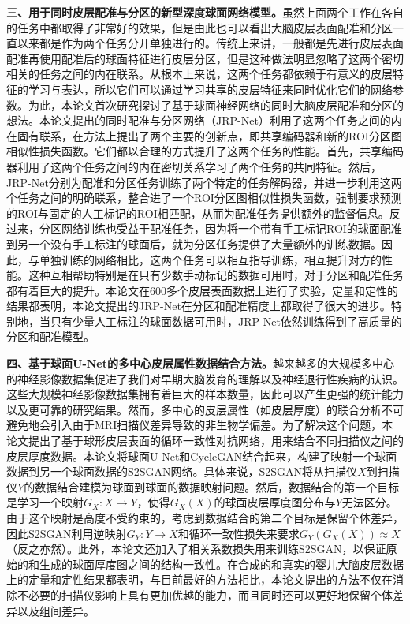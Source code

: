 \textbf{三、用于同时皮层配准与分区的新型深度球面网络模型。}虽然上面两个工作在各自的任务中都取得了非常好的效果，但是由此也可以看出大脑皮层表面配准和分区一直以来都是作为两个任务分开单独进行的。传统上来讲，一般都是先进行皮层表面配准再使用配准后的球面特征进行皮层分区，但是这种做法明显忽略了这两个密切相关的任务之间的内在联系。从根本上来说，这两个任务都依赖于有意义的皮层特征的学习与表达，所以它们可以通过学习共享的皮层特征来同时优化它们的网络参数。为此，本论文首次研究探讨了基于球面神经网络的同时大脑皮层配准和分区的想法。本论文提出的同时配准与分区网络（JRP-Net）利用了这两个任务之间的内在固有联系，在方法上提出了两个主要的创新点，即共享编码器和新的ROI分区图相似性损失函数。它们都以合理的方式提升了这两个任务的性能。首先，共享编码器利用了这两个任务之间的内在密切关系学习了两个任务的共同特征。然后，JRP-Net分别为配准和分区任务训练了两个特定的任务解码器，并进一步利用这两个任务之间的明确联系，整合进了一个ROI分区图相似性损失函数，强制要求预测的ROI与固定的人工标记的ROI相匹配，从而为配准任务提供额外的监督信息。反过来，分区网络训练也受益于配准任务，因为将一个带有手工标记ROI的球面配准到另一个没有手工标注的球面后，就为分区任务提供了大量额外的训练数据。因此，与单独训练的网络相比，这两个任务可以相互指导训练，相互提升对方的性能。这种互相帮助特别是在只有少数手动标记的数据可用时，对于分区和配准任务都有着巨大的提升。本论文在600多个皮层表面数据上进行了实验，定量和定性的结果都表明，本论文提出的JRP-Net在分区和配准精度上都取得了很大的进步。特别地，当只有少量人工标注的球面数据可用时，JRP-Net依然训练得到了高质量的分区和配准模型。

\textbf{四、基于球面U-Net的多中心皮层属性数据结合方法。}越来越多的大规模多中心的神经影像数据集促进了我们对早期大脑发育的理解以及神经退行性疾病的认识。这些大规模神经影像数据集拥有着巨大的样本数量，因此可以产生更强的统计能力以及更可靠的研究结果。然而，多中心的皮层属性（如皮层厚度）的联合分析不可避免地会引入由于MRI扫描仪差异导致的非生物学偏差。为了解决这个问题，本论文提出了基于球形皮层表面的循环一致性对抗网络，用来结合不同扫描仪之间的皮层厚度数据。本论文将球面U-Net和CycleGAN结合起来，构建了映射一个球面数据到另一个球面数据的S2SGAN网络。具体来说，S2SGAN将从扫描仪$X$到扫描仪$Y$的数据结合建模为球面到球面的数据映射问题。然后，数据结合的第一个目标是学习一个映射$G_X:X\rightarrow Y$，使得$G_X(X)$的球面皮层厚度图分布与$Y$无法区分。由于这个映射是高度不受约束的，考虑到数据结合的第二个目标是保留个体差异，因此S2SGAN利用逆映射$G_Y:Y\rightarrow X$和循环一致性损失来要求$G_Y(G_X(X))\approx X$（反之亦然）。此外，本论文还加入了相关系数损失用来训练S2SGAN，以保证原始的和生成的球面厚度图之间的结构一致性。在合成的和真实的婴儿大脑皮层数据上的定量和定性结果都表明，与目前最好的方法相比，本论文提出的方法不仅在消除不必要的扫描仪影响上具有更加优越的能力，而且同时还可以更好地保留个体差异以及组间差异。


